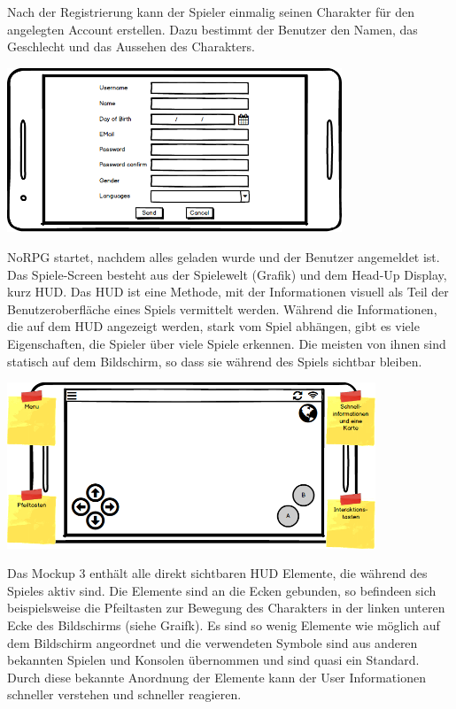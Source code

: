 			Nach der Registrierung kann der Spieler einmalig seinen Charakter für den angelegten Account erstellen. Dazu bestimmt der Benutzer den Namen, das Geschlecht und das Aussehen des Charakters.
			
			\begin{center}
				\includegraphics[width=10cm]{pics/Register_Mockup.png}
			\end{center}
			
			NoRPG startet, nachdem alles geladen wurde und der Benutzer angemeldet ist. Das Spiele-Screen besteht aus der Spielewelt (Grafik) und dem Head-Up Display, kurz HUD. Das HUD ist eine Methode, mit der Informationen visuell als Teil der Benutzeroberfläche eines Spiels vermittelt werden. Während die Informationen, die auf dem HUD angezeigt werden, stark vom Spiel abhängen, gibt es viele Eigenschaften, die Spieler über viele Spiele erkennen. Die meisten von ihnen sind statisch auf dem Bildschirm, so dass sie während des Spiels sichtbar bleiben. 
			
			\begin{center}
				\includegraphics[width=11cm]{pics/HUD_Mockup.png}
			\end{center}
			
			Das Mockup 3 enthält alle direkt sichtbaren HUD Elemente, die während des Spieles aktiv sind. Die Elemente sind an die Ecken gebunden, so befindeen sich beispielsweise die Pfeiltasten zur Bewegung des Charakters in der linken unteren Ecke des Bildschirms (siehe Graifk). Es sind so wenig Elemente wie möglich auf dem Bildschirm angeordnet und die verwendeten Symbole sind aus anderen bekannten Spielen und Konsolen übernommen und sind quasi ein Standard. Durch diese bekannte Anordnung der Elemente kann der User Informationen schneller verstehen und schneller reagieren. %
			
